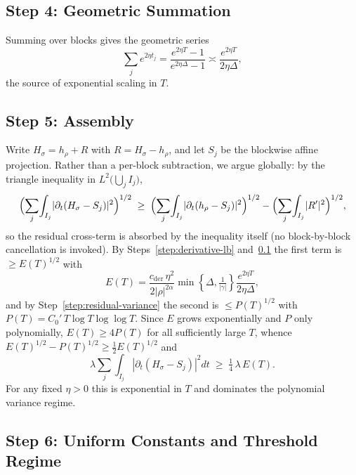 \subsection{Step 4: Geometric Summation}\label{step:geom-sum}

Summing over blocks gives the geometric series
\begin{equation}
\sum_j e^{2\eta t_j}
   = \frac{e^{2\eta T}-1}{e^{2\eta\Delta}-1}
   \asymp \frac{e^{2\eta T}}{2\eta\Delta},
\label{eq:geom-sum}
\end{equation}
the source of exponential scaling in $T$.

\subsection{Step 5: Assembly}\label{step:assembly}

Write $H_\sigma=h_\rho+R$ with $R=H_\sigma-h_\rho$, and let $S_j$ be the blockwise
affine projection.  Rather than a per-block subtraction, we argue globally: by the
triangle inequality in $L^2\bigl(\bigcup_j I_j\bigr)$,
\[
\Bigl(\sum_j\!\int_{I_j}\!|\partial_t(H_\sigma-S_j)|^2\Bigr)^{1/2}
\;\ge\;
\Bigl(\sum_j\!\int_{I_j}\!|\partial_t(h_\rho-S_j)|^2\Bigr)^{1/2}
-\Bigl(\sum_j\!\int_{I_j}\!|R'|^2\Bigr)^{1/2},
\]
so the residual cross-term is absorbed by the inequality itself (no
block-by-block cancellation is invoked).  By Steps~\ref{step:derivative-lb}
and~\ref{step:geom-sum} the first term is $\ge E(T)^{1/2}$ with
\[
E(T)=\frac{c_{\mathrm{der}}\,\eta^2}{2|\rho|^{2\alpha}}
        \min\!\left\{\!\Delta,\tfrac{1}{|\gamma|}\!\right\}\frac{e^{2\eta T}}{2\eta\Delta},
\]
and by Step~\ref{step:residual-variance} the second is $\le P(T)^{1/2}$ with
$P(T)=C_0'\,T\log T\log\log T$.  Since $E$ grows exponentially and $P$ only
polynomially, $E(T)\ge 4P(T)$ for all sufficiently large $T$, whence
$E(T)^{1/2}-P(T)^{1/2}\ge \tfrac12 E(T)^{1/2}$ and
\begin{equation}
\lambda\!\sum_j\!\int_{I_j}\!|\partial_t(H_\sigma-S_j)|^2dt
  \;\ge\; \tfrac14\,\lambda\,E(T).
\label{eq:assembly}
\end{equation}
For any fixed $\eta>0$ this is exponential in $T$ and dominates the polynomial
variance regime.

\subsection{Step 6: Uniform Constants and Threshold Regime}\label{step:uniform}

